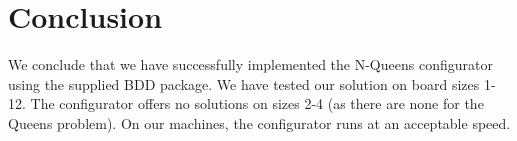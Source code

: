 \section{Conclusion}
\label{Conclusion}
We conclude that we have successfully implemented the N-Queens configurator using the supplied BDD package. We have tested our solution on board sizes 1-12. The configurator offers no solutions on sizes 2-4 (as there are none for the Queens problem). On our machines, the configurator runs at an acceptable speed.